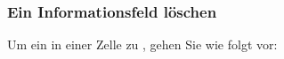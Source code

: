 \subsubsection{Ein Informationsfeld löschen\label{transactions-list-fields-remove}}

Um ein  in einer Zelle zu , gehen Sie wie folgt vor:

